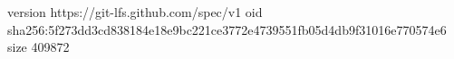 version https://git-lfs.github.com/spec/v1
oid sha256:5f273dd3cd838184e18e9bc221ce3772e4739551fb05d4db9f31016e770574e6
size 409872
